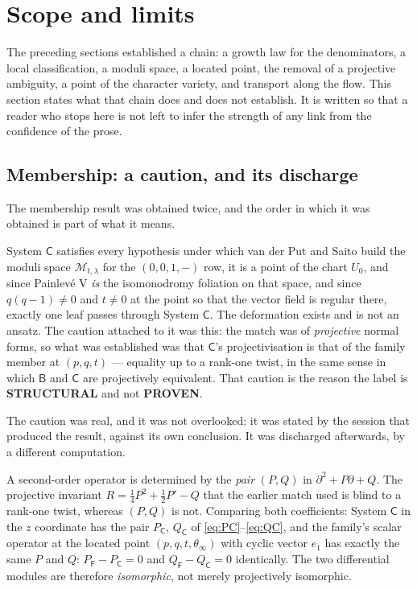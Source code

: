 \section{Scope and limits}\label{sec:limits}

The preceding sections established a chain: a growth law for the denominators,
a local classification, a moduli space, a located point, the removal of a
projective ambiguity, a point of the character variety, and transport along the
flow. This section states what that chain does and does not establish. It is
written so that a reader who stops here is not left to infer the strength of
any link from the confidence of the prose.

\subsection{Membership: a caution, and its discharge}\label{ssec:verdict}

The membership result was obtained twice, and the order in which it was
obtained is part of what it means.

\begin{remark}
System $\mathsf C$ satisfies every hypothesis under which van der Put and Saito
build the moduli space $\mathcal M_{t,\lambda}$ for the $(0,0,1,-)$ row, it is a point of the
chart $U_0$, and since Painlev\'e V \emph{is} the isomonodromy foliation on
that space, and since $q(q-1)\neq0$ and $t\neq0$ at the point so that the
vector field is regular there, exactly one leaf passes through System
$\mathsf C$. The deformation exists and is not an ansatz. The caution attached
to it was this: the match was of \emph{projective} normal forms, so what was
established was that $\mathsf C$'s projectivisation is that of the family
member at $(p,q,t)$ --- equality up to a rank-one twist, in the same sense in
which $\mathsf B$ and $\mathsf C$ are projectively equivalent. That caution is
the reason the label is \textbf{STRUCTURAL} and not \textbf{PROVEN}.
\end{remark}

The caution was real, and it was not overlooked: it was stated by the session
that produced the result, against its own conclusion. It was discharged
afterwards, by a different computation.

\begin{remark}
A second-order operator is determined by the \emph{pair} $(P,Q)$ in
$\partial^2+P\partial+Q$. The projective invariant
$R=\tfrac14P^2+\tfrac12P'-Q$ that the earlier match used is blind to a rank-one twist,
whereas $(P,Q)$ is not. Comparing both coefficients: System $\mathsf C$ in the
$z$ coordinate has the pair $P_{\mathsf C}$, $Q_{\mathsf C}$ of
\eqref{eq:PC}--\eqref{eq:QC},
and the family's scalar operator at the located point $(p,q,t,\theta_\infty)$
with cyclic vector $e_1$ has exactly the same $P$ and $Q$:
$P_{\mathsf F}-P_{\mathsf C}=0$ and $Q_{\mathsf F}-Q_{\mathsf C}=0$
identically. The two differential modules are therefore \emph{isomorphic}, not
merely projectively isomorphic.
\end{remark}

